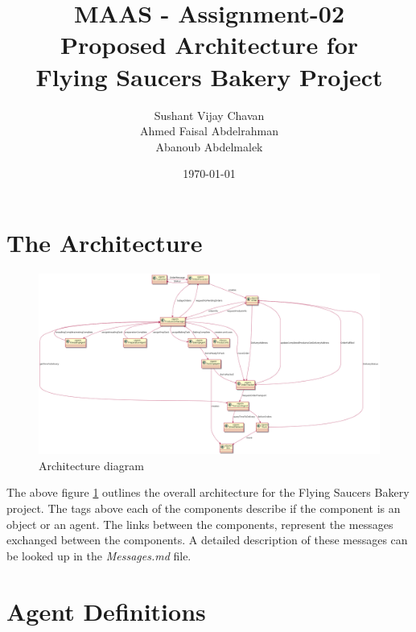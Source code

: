 \documentclass[11pt, a4paper]{article}
\title{MAAS - Assignment-02\\
Proposed Architecture for \\Flying Saucers Bakery Project}
\author{Sushant Vijay Chavan\\Ahmed Faisal Abdelrahman\\Abanoub Abdelmalek}
\date{\today}
\begin{document}
\maketitle
\newpage
\newpage

\section{The Architecture}
\begin{figure}[h!]
	\centering
	\includegraphics[angle=90, scale=0.27]{../Bakery.png}
	\caption{Architecture diagram}
	\label{Architecture diagram}
\end{figure}
The above figure \ref{Architecture diagram} outlines the overall architecture for the Flying Saucers Bakery project. The tags  above each of the components describe if the component is an object or an agent. The links between the components, represent the messages exchanged between the components. A detailed description of these messages can be looked up in the \textit{Messages.md} file.

\section{Agent Definitions}
\end{document}
